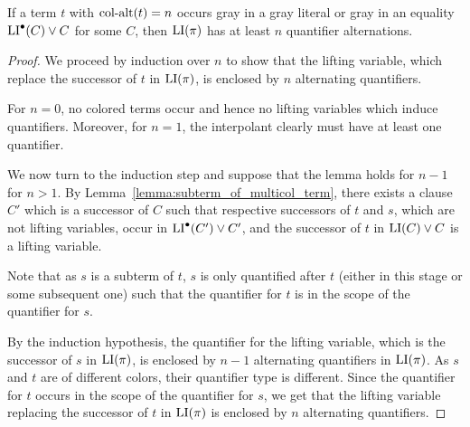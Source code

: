 \documentclass[%
	draft=false,%
	numbers=noendperiod,%
	11pt,%
	a4paper,%
	oneside,%
	openany,%
]{memoir}
\begin{document}
\begin{clemma}
	If a term $t$ with $\operatorname{col-alt}(t)=n$ occurs gray in a gray literal or gray in an equality $\operatorname{LI}^\bullet(C) \lor C$ for some $C$, then $\operatorname{LI}(\pi)$ has at least $n$ quantifier alternations.
\end{clemma}
\begin{proof}
	We proceed by induction over $n$ to show that the lifting variable, which replace the successor of $t$ in $\operatorname{LI}(\pi)$, is enclosed by $n$ alternating quantifiers.

	For $n=0$, no colored terms occur and hence no lifting variables which induce quantifiers.
	Moreover, for $n=1$, the interpolant clearly must have at least one quantifier.

	We now turn to the induction step and suppose that the lemma holds for $n-1$ for $n>1$.
	By Lemma~\ref{lemma:subterm_of_multicol_term},
	there exists a clause $C'$ which is a successor of $C$ such that respective successors of $t$ and $s$, which are not lifting variables, occur in $\operatorname{LI}^\bullet(C') \lor C'$, and the successor of $t$ in $\operatorname{LI}(C) \lor C$ is a lifting variable.

	Note that as $s$ is a subterm of $t$, $s$ is only quantified after $t$ (either in this stage or some subsequent one) such that the quantifier for $t$ is in the scope of the quantifier for $s$. 

	By the induction hypothesis, the quantifier for the lifting variable, which is the successor of $s$ in $\operatorname{LI}(\pi)$, is enclosed by $n-1$ alternating quantifiers in $\operatorname{LI}(\pi)$. 
	As $s$ and $t$ are of different colors, their quantifier type is different.
	Since the quantifier for $t$ occurs in the scope of the quantifier for $s$, we get that the lifting variable replacing the successor of $t$ in $\operatorname{LI}(\pi)$ is enclosed by $n$ alternating quantifiers.
\end{proof}
\cbend


\end{document}

